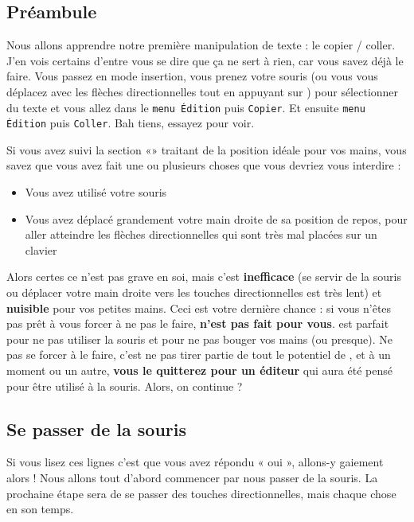\subsection{Préambule}

Nous allons apprendre notre première manipulation de texte : le copier / coller. J'en vois certains d'entre vous se dire que ça ne sert à rien, car vous savez déjà le faire. Vous passez en mode insertion, vous prenez votre souris (ou vous vous déplacez avec les flèches directionnelles tout en appuyant sur \ttshift) pour sélectionner du texte et vous allez dans le \Verb|menu Édition| puis \Verb|Copier|. Et ensuite \Verb|menu Édition| puis \Verb|Coller|. Bah tiens, essayez pour voir.

Si vous avez suivi la section «» traitant de la position idéale pour vos mains, vous savez que vous avez fait une ou plusieurs choses que vous devriez vous interdire :


\begin{itemize}
    \item Vous avez utilisé votre souris
    \item Vous avez déplacé grandement votre main droite de sa position de repos, pour aller atteindre les flèches directionnelles qui sont très mal placées sur un clavier
\end{itemize}


Alors certes ce n'est pas grave en soi, mais c'est \textbf{inefficace} (se servir de la souris ou déplacer votre main droite vers les touches directionnelles est très lent) et \textbf{nuisible} pour vos petites mains. Ceci est votre dernière chance : si vous n'êtes pas prêt à vous forcer à ne pas le faire, \textbf{\vim n'est pas fait pour vous}. \vim est parfait pour ne pas utiliser la souris et pour ne pas bouger vos mains (ou presque). Ne pas se forcer à le faire, c'est ne pas tirer partie de tout le potentiel de \vim, et à un moment ou un autre, \textbf{vous le quitterez pour un éditeur} qui aura été pensé pour être utilisé à la souris. Alors, on continue ?

\subsection{Se passer de la souris}

Si vous lisez ces lignes c'est que vous avez répondu « oui », allons-y gaiement alors ! Nous allons tout d'abord commencer par nous passer de la souris. La prochaine étape sera de se passer des touches directionnelles, mais chaque chose en son temps.


